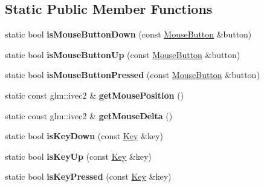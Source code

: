 \subsection*{Static Public Member Functions}
\begin{DoxyCompactItemize}
\item 
\hypertarget{class_input_system_a29eba809fcf20f75547017310b0aae6e}{}static bool {\bfseries is\+Mouse\+Button\+Down} (const \hyperlink{class_input_system_a15198fc75c6a495ef51eccbf1f8882f5}{Mouse\+Button} \&button)\label{class_input_system_a29eba809fcf20f75547017310b0aae6e}

\item 
\hypertarget{class_input_system_a062872c6d9889ab14dbc9a9e4d429166}{}static bool {\bfseries is\+Mouse\+Button\+Up} (const \hyperlink{class_input_system_a15198fc75c6a495ef51eccbf1f8882f5}{Mouse\+Button} \&button)\label{class_input_system_a062872c6d9889ab14dbc9a9e4d429166}

\item 
\hypertarget{class_input_system_aa6b91f49abdaf00e71374d7e93ce2b5d}{}static bool {\bfseries is\+Mouse\+Button\+Pressed} (const \hyperlink{class_input_system_a15198fc75c6a495ef51eccbf1f8882f5}{Mouse\+Button} \&button)\label{class_input_system_aa6b91f49abdaf00e71374d7e93ce2b5d}

\item 
\hypertarget{class_input_system_a119e4c4b3e169f2b8bf917eb039cecb0}{}static const glm\+::ivec2 \& {\bfseries get\+Mouse\+Position} ()\label{class_input_system_a119e4c4b3e169f2b8bf917eb039cecb0}

\item 
\hypertarget{class_input_system_a8016f61bc9346eb0c4de150914b222e1}{}static const glm\+::ivec2 \& {\bfseries get\+Mouse\+Delta} ()\label{class_input_system_a8016f61bc9346eb0c4de150914b222e1}

\item 
\hypertarget{class_input_system_a3947168cc9c1fc253b06c0184d8b5e75}{}static bool {\bfseries is\+Key\+Down} (const \hyperlink{class_input_system_ad2fd19ae265c6309c2f91259b757e8b4}{Key} \&key)\label{class_input_system_a3947168cc9c1fc253b06c0184d8b5e75}

\item 
\hypertarget{class_input_system_a36b82a049cb6d46ce270b09ce850551b}{}static bool {\bfseries is\+Key\+Up} (const \hyperlink{class_input_system_ad2fd19ae265c6309c2f91259b757e8b4}{Key} \&key)\label{class_input_system_a36b82a049cb6d46ce270b09ce850551b}

\item 
\hypertarget{class_input_system_aea8e133d1801929c9957a27ddc2b1b59}{}static bool {\bfseries is\+Key\+Pressed} (const \hyperlink{class_input_system_ad2fd19ae265c6309c2f91259b757e8b4}{Key} \&key)\label{class_input_system_aea8e133d1801929c9957a27ddc2b1b59}

\end{DoxyCompactItemize}


